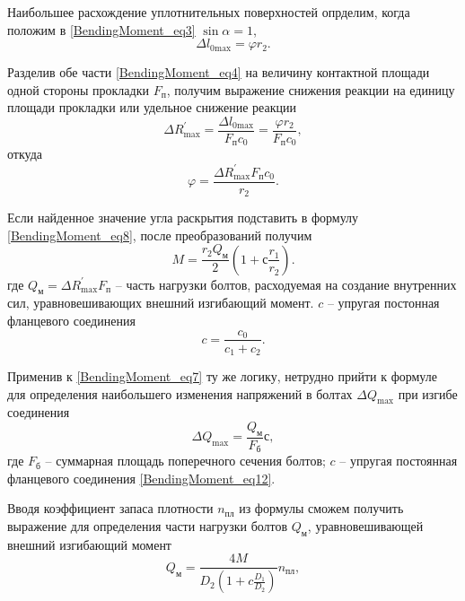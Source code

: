 Наибольшее расхождение уплотнительных поверхностей опрделим, когда положим в \eqref{BendingMoment_eq3} $\sin{\alpha}=1$,
\begin{equation*}
  \Delta l_{0 \text{max}}=\varphi r_2.
\end{equation*}

Разделив обе части \eqref{BendingMoment_eq4} на величину контактной площади одной стороны прокладки $F_{\text{п}}$, получим выражение снижения реакции на единицу площади прокладки или удельное снижение реакции
\begin{equation}
  \label{BendingMoment_eq9}
  \Delta R_{\text{max}}^{\prime}=\frac{\Delta l_{0 \text{max}}}{F_{\text{п}}c_0}=\frac{\varphi r_2}{F_{\text{п}}c_0},
\end{equation}
откуда 
\begin{equation}
  \label{BendingMoment_eq10}
  \varphi=\frac{\Delta R_{\text{max}}^{\prime}F_{\text{п}}c_0}{r_2}.
\end{equation}

Если найденное значение угла раскрытия подставить в формулу \eqref{BendingMoment_eq8}, после преобразований получим 
\begin{equation}
  \label{BendingMoment_eq11}
  M=\frac{r_2Q_{\text{м}}}{2}\left(1+с\frac{r_1}{r_2}\right).
\end{equation}
где $Q_{\text{м}}=\Delta R_{\text{max}}^{\prime}F_{\text{п}}$ -- часть нагрузки болтов, расходуемая на создание внутренних сил, уравновешивающих внешний изгибающий момент.
$c$ -- упругая постонная фланцевого соединения 
\begin{equation}
  \label{BendingMoment_eq12}
  c=\frac{c_0}{c_1+c_2}.
\end{equation}

Применив к \eqref{BendingMoment_eq7} ту же логику, нетрудно прийти к формуле для определения наибольшего изменения напряжений в болтах $\Delta Q_{\text{max}}$ при изгибе соединения
\begin{equation}
  \label{BendingMoment_eq13}
  \Delta Q_{\text{max}}=\frac{Q_{\text{м}}}{F_{\text{б}}}с,
\end{equation}
где $F_{\text{б}}$ -- суммарная площадь поперечного сечения болтов;
$c$ -- упругая постоянная фланцевого соединения \eqref{BendingMoment_eq12}.

Вводя коэффициент запаса плотности $n_{\text{пл}}$ из формулы  сможем получить выражение для определения части нагрузки болтов $Q_{\text{м}}$, уравновешивающей внешний изгибающий момент
\begin{equation}
  \label{BendingMoment_eq14}
  Q_{\text{м}}=\frac{4M}{D_2\left(1+c\frac{D_1}{D_2}\right)}n_{\text{пл}},
\end{equation}

